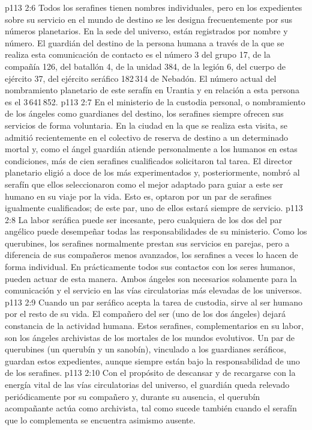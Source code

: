 \vs p113 2:6 \pc Todos los serafines tienen nombres individuales, pero en los expedientes sobre su servicio en el mundo de destino se les designa frecuentemente por sus números planetarios. En la sede del universo, están registrados por nombre y número. El guardián del destino de la persona humana a través de la que se realiza esta comunicación de contacto es el número 3 del grupo 17, de la compañía 126, del batallón 4, de la unidad 384, de la legión 6, del cuerpo de ejército 37, del ejército seráfico 182\,314 de Nebadón. El número actual del nombramiento planetario de este serafín en Urantia y en relación a esta persona es el 3\,641\,852.
\vs p113 2:7 \pc En el ministerio de la custodia personal, o nombramiento de los ángeles como guardianes del destino, los serafines siempre ofrecen sus servicios de forma voluntaria. En la ciudad en la que se realiza esta visita, se admitió recientemente en el colectivo de reserva de destino a un determinado mortal y, como el ángel guardián atiende personalmente a los humanos en estas condiciones, más de cien serafines cualificados solicitaron tal tarea. El director planetario eligió a doce de los más experimentados y, posteriormente, nombró al serafín que ellos seleccionaron como el mejor adaptado para guiar a este ser humano en su viaje por la vida. Esto es, optaron por un par de serafines igualmente cualificados; de este par, uno de ellos estará siempre de servicio.
\vs p113 2:8 La labor seráfica puede ser incesante, pero cualquiera de los dos del par angélico puede desempeñar todas las responsabilidades de su ministerio. Como los querubines, los serafines normalmente prestan sus servicios en parejas, pero a diferencia de sus compañeros menos avanzados, los serafines a veces lo hacen de forma individual. En prácticamente todos sus contactos con los seres humanos, pueden actuar de esta manera. Ambos ángeles son necesarios solamente para la comunicación y el servicio en las vías circulatorias más elevadas de los universos.
\vs p113 2:9 Cuando un par seráfico acepta la tarea de custodia, sirve al ser humano por el resto de su vida. El compañero del ser (uno de los dos ángeles) dejará constancia de la actividad humana. Estos serafines, complementarios en su labor, son los ángeles archivistas de los mortales de los mundos evolutivos. Un par de querubines (un querubín y un sanobín), vinculado a los guardianes seráficos, guardan estos expedientes, aunque siempre están bajo la responsabilidad de uno de los serafines.
\vs p113 2:10 Con el propósito de descansar y de recargarse con la energía vital de las vías circulatorias del universo, el guardián queda relevado periódicamente por su compañero y, durante su ausencia, el querubín acompañante actúa como archivista, tal como sucede también cuando el serafín que lo complementa se encuentra asimismo ausente.
